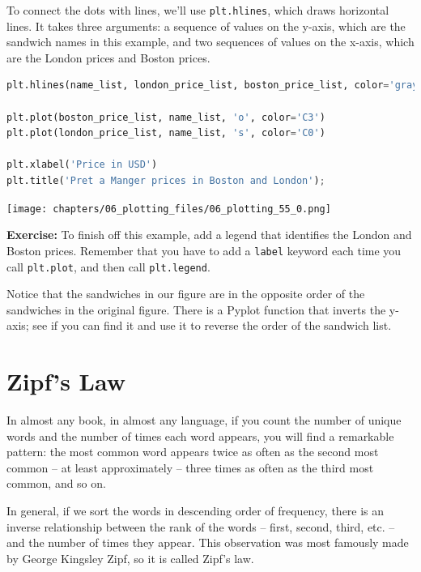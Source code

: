 To connect the dots with lines, we'll use
\passthrough{\lstinline!plt.hlines!}, which draws horizontal lines. It
takes three arguments: a sequence of values on the y-axis, which are the
sandwich names in this example, and two sequences of values on the
x-axis, which are the London prices and Boston prices.

\begin{lstlisting}[language=Python,style=source]
plt.hlines(name_list, london_price_list, boston_price_list, color='gray')

plt.plot(boston_price_list, name_list, 'o', color='C3')
plt.plot(london_price_list, name_list, 's', color='C0')

plt.xlabel('Price in USD')
plt.title('Pret a Manger prices in Boston and London');
\end{lstlisting}

\begin{center}
\texttt{[image: chapters/06\_plotting\_files/06\_plotting\_55\_0.png]}
\end{center}

\textbf{Exercise:} To finish off this example, add a legend that
identifies the London and Boston prices. Remember that you have to add a
\passthrough{\lstinline!label!} keyword each time you call
\passthrough{\lstinline!plt.plot!}, and then call
\passthrough{\lstinline!plt.legend!}.

Notice that the sandwiches in our figure are in the opposite order of
the sandwiches in the original figure. There is a Pyplot function that
inverts the y-axis; see if you can find it and use it to reverse the
order of the sandwich list.

\section{Zipf's Law}\label{zipfs-law}

In almost any book, in almost any language, if you count the number of
unique words and the number of times each word appears, you will find a
remarkable pattern: the most common word appears twice as often as the
second most common -- at least approximately -- three times as often as
the third most common, and so on.

In general, if we sort the words in descending order of frequency, there
is an inverse relationship between the rank of the words -- first,
second, third, etc. -- and the number of times they appear. This
observation was most famously made by George Kingsley Zipf, so it is
called Zipf's law.

